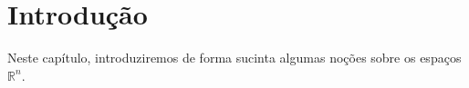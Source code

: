 \chapter{Introdução}
Neste capítulo, introduziremos de forma sucinta algumas noções sobre os espaços $\mathbb R^n$.



